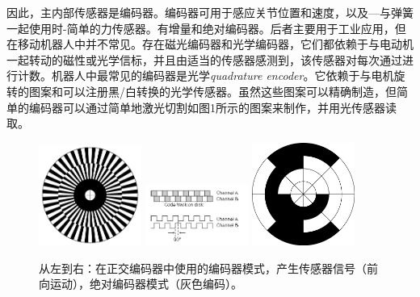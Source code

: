因此，主内部传感器是编码器。编码器可用于感应关节位置和速度，以及---与弹簧一起使用时-简单的力传感器。有增量和绝对编码器。后者主要用于工业应用，但在移动机器人中并不常见。存在磁光编码器和光学编码器，它们都依赖于与电动机一起转动的磁性或光学信标，并且由适当的传感器感测到，该传感器对每次通过进行计数。机器人中最常见的编码器是光学\emph{quadrature encoder}。它依赖于与电机旋转的图案和可以注册黑/白转换的光学传感器。虽然这些图案可以精确制造，但简单的编码器可以通过简单地激光切割如图1所示的图案来制作，并用光传感器读取。

\begin{figure}
	\centering
		\includegraphics[width=0.3\textwidth]{figs/encoderdisk.png}
		\includegraphics[width=0.3\textwidth]{figs/quadraturencoder.png}
		\includegraphics[width=0.3\textwidth]{figs/absoluteencoder.png}
	\caption{从左到右：在正交编码器中使用的编码器模式，产生传感器信号（前向运动），绝对编码器模式（灰色编码）。}
	\label{fig:encoders}
\end{figure}



